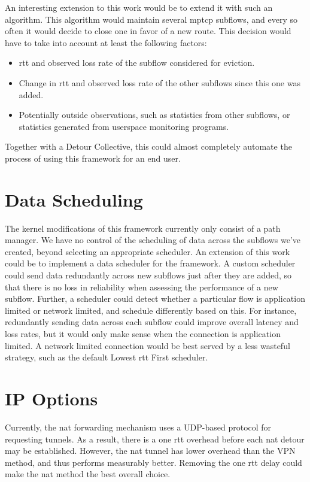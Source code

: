 \documentclass{cwru}
\begin{document}
An interesting extension to this work would be to extend it with such an
algorithm. This algorithm would maintain several \ac{mptcp} subflows, and every
so often it would decide to close one in favor of a new route. This decision
would have to take into account at least the following factors:

\begin{itemize}
\item \ac{rtt} and observed loss rate of the subflow considered for eviction.
\item Change in \ac{rtt} and observed loss rate of the other subflows since this
  one was added.
\item Potentially outside observations, such as statistics from other subflows,
  or statistics generated from userspace monitoring programs.
\end{itemize}

Together with a Detour Collective, this could almost completely automate the
process of using this framework for an end user.

\section{Data Scheduling}

The kernel modifications of this framework currently only consist of a path
manager. We have no control of the scheduling of data across the subflows we've
created, beyond selecting an appropriate scheduler. An extension of this work
could be to implement a data scheduler for the framework. A custom scheduler
could send data redundantly across new subflows just after they are added, so
that there is no loss in reliability when assessing the performance of a new
subflow. Further, a scheduler could detect whether a particular flow is
application limited or network limited, and schedule differently based on this.
For instance, redundantly sending data across each subflow could improve overall
latency and loss rates, but it would only make sense when the connection is
application limited. A network limited connection would be best served by a less
wasteful strategy, such as the default Lowest \ac{rtt} First scheduler.

\section{IP Options}

Currently, the \ac{nat} forwarding mechanism uses a UDP-based protocol for
requesting tunnels. As a result, there is a one \ac{rtt} overhead before each
\ac{nat} detour may be established. However, the \ac{nat} tunnel has lower
overhead than the VPN method, and thus performs measurably better. Removing the
one \ac{rtt} delay could make the \ac{nat} method the best overall choice.
\end{document}

